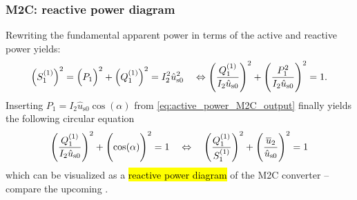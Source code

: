 \begin{frame}[c]
	\frametitle{M2C: reactive power diagram}
	Rewriting the fundamental apparent power in terms of the active and reactive power yields:
	\begin{equation}
		\left(S_1^{(1)}\right)^2 = \left(P_1\vphantom{Q_1^{(1)}}\right)^2 + \left(Q_1^{(1)}\right)^2 = I_2^2 \hat{u}^2_\mathrm{s0}  \quad \Leftrightarrow \left(\frac{Q_1^{(1)}}{I_2 \hat{u}_\mathrm{s0}}\right)^2 + \left(\frac{P_1^2}{I_2 \hat{u}_\mathrm{s0}}\vphantom{\frac{Q_1^{(1)}}{I_2 \hat{u}_\mathrm{s0}}}\right)^2 = 1.
	\end{equation}\pause
	Inserting $P_1 = I_2 \hat{u}_\mathrm{s0} \cos(\alpha)$ from \eqref{eq:active_power_M2C_output} finally yields the following circular equation
	\begin{equation}
		\left(\frac{Q_1^{(1)}}{I_2 \hat{u}_\mathrm{s0}}\right)^2 + \left(\cos(\alpha)\vphantom{\frac{Q_1^{(1)}}{I_2 \hat{u}_\mathrm{s0}}}\right)^2 = 1 \quad \Leftrightarrow \quad \left(\frac{Q_1^{(1)}}{S_1^{(1)}}\right)^2 + \left(\frac{\overline{u}_2}{\hat{u}_\mathrm{s0}}\vphantom{\frac{Q_1^{(1)}}{S_1^{(1)}}}\right)^2 = 1
	\end{equation}
	which can be visualized as a \hl{reactive power diagram} of the M2C converter -- compare the upcoming .
\end{frame}

